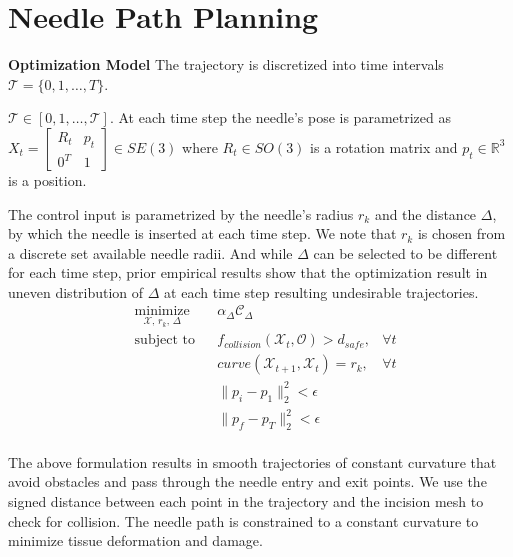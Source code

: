 \documentclass[0-suturing.tex]{subfiles}
\begin{document}
\section{Needle Path Planning}
\noindent \textbf{Optimization Model}
The trajectory is discretized into time intervals $\mathcal{T} = \{0,1,\ldots,T\}$.



$\mathcal{T} \in [0, 1, \ldots, \mathcal{T}]$.
At each time step the needle's pose is parametrized as
$X_t = \begin{bmatrix}
    R_t & p_t \\ 0^T & 1
\end{bmatrix} \in SE(3)$
where $R_t \in SO(3)$ is a rotation matrix and
$ p_t \in  \mathbb{R}^3 $ is a position.

The control input is parametrized by the needle's radius $r_k$ and the distance $\Delta$, by which the needle is inserted at each time step. We note that $r_k$ is chosen from a discrete set available needle radii. And while $\Delta$ can be selected to be different for each time step, prior empirical results show that the optimization result in uneven distribution of $\Delta$ at each time step resulting undesirable trajectories.
\begin{equation*}
\begin{aligned}
& \underset{\mathcal{X},\, r_k,\, \Delta}{\text{minimize}}
& & \alpha_\Delta \mathcal{C}_\Delta \\
& \text{subject to}
& & f_{collision}(\mathcal{X}_t, \mathcal{O}) > d_{safe}, & \forall t  \\
& & & curve(\mathcal{X}_{t+1}, \mathcal{X}_t) = r_k, & \forall t  \\
& & & \|p_i-p_1\|_2^2 < \epsilon \\
& & & \|p_f-p_T\|_2^2 < \epsilon \\
\end{aligned}
\end{equation*}

The above formulation results in smooth trajectories of constant curvature that
avoid obstacles and pass through the needle entry and exit points. We use the
signed distance between each point in the trajectory and the incision mesh to
check for collision. The needle path is constrained to a constant curvature to
minimize tissue deformation and damage.
\end{document}
